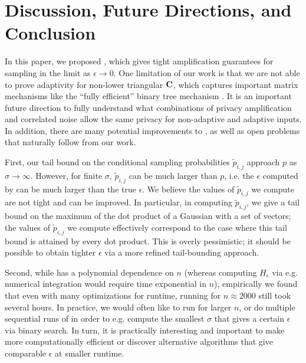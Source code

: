 \section{Discussion, Future Directions, and Conclusion}

In this paper, we proposed \MMCC{}, which gives tight amplification guarantees for sampling in the limit as $\epsilon \rightarrow 0$. One limitation of our work is that we are not able to prove adaptivity for non-lower triangular $\mathbf{C}$, which captures important matrix mechanisms like the ``fully efficient'' binary tree mechanism \citep{honaker15}. It is an important future direction to fully understand what combinations of privacy amplification and correlated noise allow the same privacy for non-adaptive and adaptive inputs. In addition, there are many potential improvements to \MMCC{}, as well as open problems that naturally follow from our work. 

First, our tail bound on the conditional sampling probabilities $\tilde{p}_{i,j}$ approach $p$ as $\sigma \rightarrow \infty$. However, for finite $\sigma$, $\tilde{p}_{i,j}$ can be much larger than $p$, i.e. the $\epsilon$ computed by \MMCC{} can be much larger than the true $\epsilon$. We believe the values of $\tilde{p}_{i,j}$ we compute are not tight and can be improved. In particular, in computing $\tilde{p}_{i,j}$, we give a tail bound on the maximum of the dot product of a Gaussian with a set of vectors; the values of $\tilde{p}_{i,j}$ we compute effectively correspond to the case where this tail bound is attained by every dot product. This is overly pessimistic; it should be possible to obtain tighter $\epsilon$ via a more refined tail-bounding approach. 

Second, while \MMCC{} has a polynomial dependence on $n$ (whereas computing $H_\epsilon$ via e.g. numerical integration would require time exponential in $n$), empirically we found that even with many optimizations for runtime, running \MMCC{} for $n \approx 2000$ still took several hours. In practice, we would often like to run for larger $n$, or do multiple sequential runs of \MMCC{} in order to e.g. compute the smallest $\sigma$ that gives a certain $\epsilon$ via binary search. In turn, it is practically interesting and important to make \MMCC{} more computationally efficient or discover alternative algorithms that give comparable $\epsilon$ at smaller runtime.


